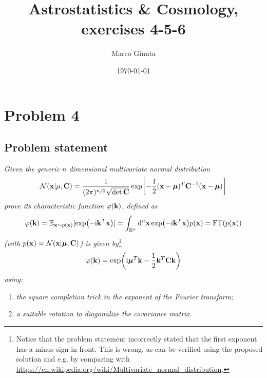 \documentclass[a4paper]{article}
\title{Astrostatistics \& Cosmology, exercises 4-5-6}%
\author{Marco Giunta}
\date{\today}
\newcommand{\R}{\mathbb{R}}
\newcommand{\mat}[1]{\vb{#1}}
\newcommand{\N}{\mathcal{N}}
\let\temp\phi%
\let\phi\varphi
\let\varphi\temp
\renewcommand{\i}{\mathrm{i}} %
\begin{document}
\maketitle
\tableofcontents

\section{Problem 4}
\subsection{Problem statement}
\textit{Given the generic $n$ dimensional multivariate normal distribution}
\begin{equation}
    \label{eq:MVN}
    \N(\vb{x}|\vb{\mu},\mat{C})=\frac{1}{(2\pi)^{n/2}\sqrt{\det \mat{C}}}\exp[-\frac{1}{2}(\vb{x}-\vb*{\mu})^T \mat{C}^{-1} (\vb{x}-\vb*{\mu})]
\end{equation}
\textit{prove its characteristic function $\phi (\vb{k})$, defined as}
\begin{equation*}
    \phi(\vb{k}) = \mathbb{E}_{\vb{x} \sim p(\vb{x})}[\exp(-\i \vb{k}^T \vb{x})]=\int_{\R^n} \dd[n]{\vb{x}}\exp(-\i \vb{k}^T \vb{x}) p(\vb{x}) = \text{FT}(p(\vb{x}))
\end{equation*}
\textit{(with $p(\vb{x}) = \mathcal{N}(\vb{x}|\vb*{\mu}, \mat{C})$) is given by}\footnote{Notice that the problem statement incorrectly stated that the first exponent has a minus sign in front. This is wrong, as can be verified using the proposed solution and e.g. by comparing with \url{https://en.wikipedia.org/wiki/Multivariate_normal_distribution}.}
\begin{equation}
    \label{eq:ch_f_MVN}
    \phi (\vb{k}) = \exp(\i \vb*{\mu}^T \vb{k} - \frac{1}{2}\vb{k}^T \mat{C} \vb{k})
\end{equation}
\textit{using:}
\begin{enumerate}
    \item \textit{the square completion trick in the exponent of the Fourier transform;}
    \item \textit{a suitable rotation to diagonalize the covariance matrix.}
\end{enumerate}
\end{document}
